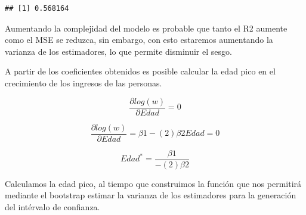 \documentclass[
]{article}
\newenvironment{Shaded}{\begin{snugshade}}{\end{snugshade}}
\newcommand{\AttributeTok}[1]{\textcolor[rgb]{0.13,0.29,0.53}{#1}}
\newcommand{\DecValTok}[1]{\textcolor[rgb]{0.00,0.00,0.81}{#1}}
\newcommand{\FunctionTok}[1]{\textcolor[rgb]{0.13,0.29,0.53}{\textbf{#1}}}
\newcommand{\NormalTok}[1]{#1}
\newcommand{\OtherTok}[1]{\textcolor[rgb]{0.56,0.35,0.01}{#1}}
\newcommand{\SpecialCharTok}[1]{\textcolor[rgb]{0.81,0.36,0.00}{\textbf{#1}}}
\begin{document}
\begin{Shaded}
\end{Shaded}

\begin{verbatim}
## [1] 0.568164
\end{verbatim}

Aumentando la complejidad del modelo es probable que tanto el R2 aumente
como el MSE se reduzca, sin embargo, con esto estaremos aumentando la
varianza de los estimadores, lo que permite disminuir el sesgo.

A partir de los coeficientes obtenidos es posible calcular la edad pico
en el crecimiento de los ingresos de las personas.

\[\frac {\partial log(w)}{\partial Edad} =0 \]

\[\frac {\partial log(w)}{\partial Edad} = \beta 1-(2) \beta2Edad=0\]

\[Edad^*=\frac {\beta1}{-(2)\beta 2}\]

Calculamos la edad pico, al tiempo que construimos la función que nos
permitirá mediante el bootstrap estimar la varianza de los estimadores
para la generación del intérvalo de confianza.
\end{document}
